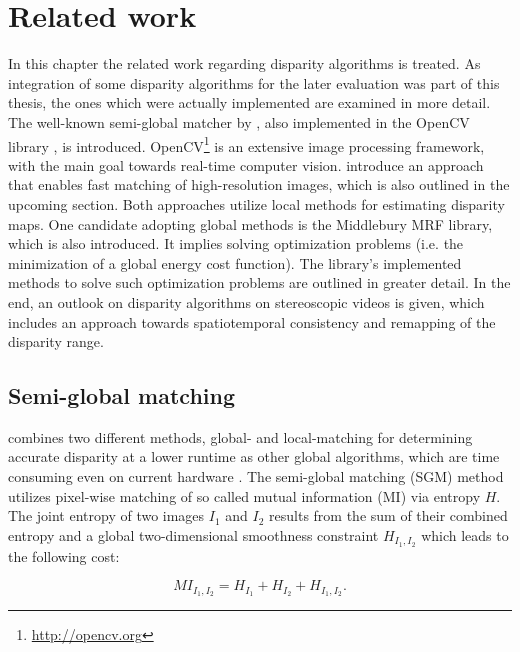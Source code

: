 \chapter{Related work}
\label{chap:related}

In this chapter the related work regarding disparity algorithms is treated.
As integration of some disparity algorithms for the later evaluation was part of this thesis, the ones which were actually implemented are examined in more detail.
The well-known semi-global matcher by \citeauthor{hirschmuller2005accurate}, also implemented in the OpenCV library \citep{opencv_library}, is introduced.
OpenCV\footnote{\url{http://opencv.org}} is an extensive image processing framework, with the main goal towards real-time computer vision.
\citeauthor{Geiger2010ACCV} introduce an approach that enables fast matching of high-resolution images, which is also outlined in the upcoming section.
Both approaches utilize local methods for estimating disparity maps.
One candidate adopting global methods is the Middlebury MRF library, which is also introduced.
It implies solving optimization problems (i.e. the minimization of a global energy cost function).
The library’s implemented methods to solve such optimization problems are outlined in greater detail.
In the end, an outlook on disparity algorithms on stereoscopic videos is given, which includes an approach towards spatiotemporal consistency and remapping of the disparity range.

\section{Semi-global matching}

\citeauthor{hirschmuller2005accurate} combines two different methods, global- and local-matching for determining accurate disparity at a lower runtime as other global algorithms,  which are time consuming even on current hardware \citep{hirschmuller2005accurate, hirschmuller2008stereo}.
\newline\newline\noindent The semi-global matching (SGM) method utilizes pixel-wise matching of so called mutual information (MI) via entropy $H$.
The joint entropy of two images $I_1$ and $I_2$ results from the sum of their combined entropy and a global two-dimensional smoothness constraint $H_{I_1,I_2}$ which leads to the following cost:

\begin{equation}
  MI_{I_1,I_2} = H_{I_1} + H_{I_2} + H_{I_1,I_2}.
\end{equation}

